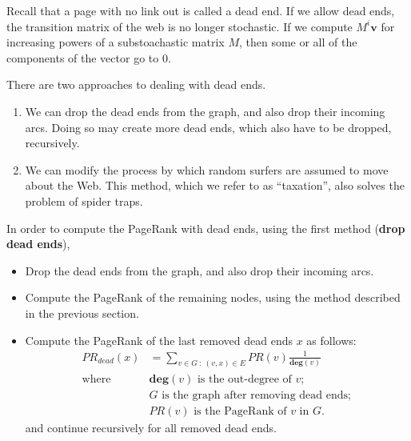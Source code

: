 Recall that a page with no link out is called a dead end. If we allow dead ends, the transition matrix of the web is no longer stochastic. If we compute $M^i \textbf{v}$ for increasing powers of a substoachastic matrix $M$, then some or all of the components of the vector go to $0$.

There are two approaches to dealing with dead ends.

\begin{enumerate}
    \item We can drop the dead ends from the graph, and also drop their incoming arcs. Doing so may create more dead ends, which also have to be dropped, recursively. 
    \item We can modify the process by which random surfers are assumed to move about the Web. This method, which we refer to as ``taxation'', also solves the problem of spider traps. 
\end{enumerate}

In order to compute the PageRank with dead ends, using the first method (\textbf{drop dead ends}),
\begin{itemize}
    \item Drop the dead ends from the graph, and also drop their incoming arcs.  
    \item Compute the PageRank of the remaining nodes, using the method described in the previous section.
    \item Compute the PageRank of the last removed dead ends $x$ as follows:
        \begin{equation}
            \begin{split}
                PR_{dead}(x) & = \sum_{v \in G \ : \ (v, x) \in E}{PR(v) \frac{1}{\textbf{deg}(v)}} \\
                \text{where } & \textbf{deg}(v) \text{ is the out-degree of } v; \\
                              & G \text{ is the graph after removing dead ends}; \\
                              & PR(v) \text{ is the PageRank of } v \text{ in } G.
            \end{split}
        \end{equation}
        and continue recursively for all removed dead ends.
\end{itemize}

